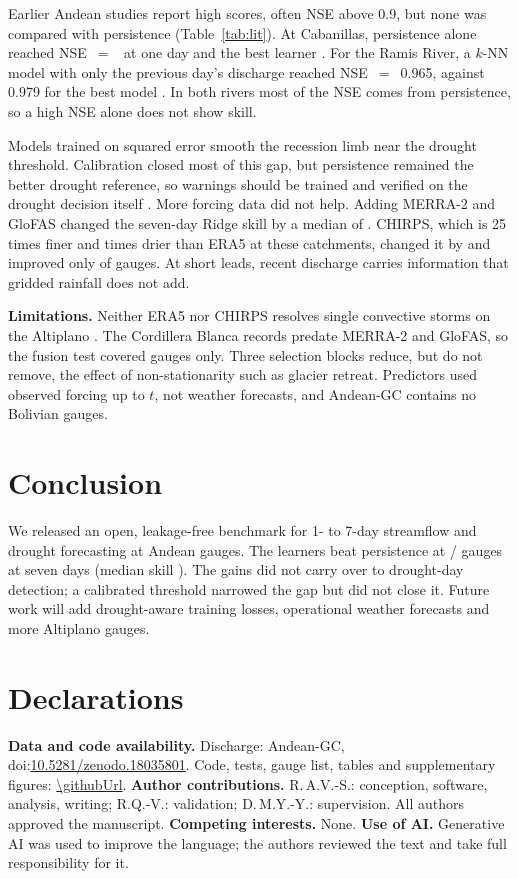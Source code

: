 \documentclass[graybox]{svmult}
\begin{document}
Earlier Andean studies report high scores, often NSE above 0.9, but none was compared with persistence (Table~\ref{tab:lit}). At Cabanillas, persistence alone reached NSE~$=$~\focusPersNseOne{} at one day and the best learner \focusBestNseOne{}. For the Ramis River, a $k$-NN model with only the previous day's discharge reached NSE~$=$~0.965, against 0.979 for the best model \cite{quispe2023ramis}. In both rivers most of the NSE comes from persistence, so a high NSE alone does not show skill.

Models trained on squared error smooth the recession limb near the drought threshold. Calibration closed most of this gap, but persistence remained the better drought reference, so warnings should be trained and verified on the drought decision itself \cite{sutanto2021definitions}. More forcing data did not help. Adding MERRA-2 and GloFAS changed the seven-day Ridge skill by a median of \fusionMedDeltaRidge{}. CHIRPS, which is 25 times finer and \eraChirpsRatio{} times drier than ERA5 at these catchments, changed it by \chirpsMedDeltaRidge{} and improved only \chirpsNPosRidge{} of \nChirps{} gauges. At short leads, recent discharge carries information that gridded rainfall does not add.

\textbf{Limitations.} Neither ERA5 nor CHIRPS resolves single convective storms on the Altiplano \cite{garreaud2003altiplano}. The Cordillera Blanca records predate MERRA-2 and GloFAS, so the fusion test covered \nFusion{} gauges only. Three selection blocks reduce, but do not remove, the effect of non-stationarity such as glacier retreat. Predictors used observed forcing up to $t$, not weather forecasts, and Andean-GC contains no Bolivian gauges.

\section{Conclusion}
\label{sec:conclusion}

We released an open, leakage-free benchmark for 1- to 7-day streamflow and drought forecasting at \nGauges{} Andean gauges. The learners beat persistence at \nPosSeven{}/\nGauges{} gauges at seven days (median skill \medSkillSeven{}). The gains did not carry over to drought-day detection; a calibrated threshold narrowed the gap but did not close it. Future work will add drought-aware training losses, operational weather forecasts and more Altiplano gauges.

\section*{Declarations}
\noindent\textbf{Data and code availability.} Discharge: Andean-GC, doi:\href{https://doi.org/10.5281/zenodo.18035801}{10.5281/zenodo.18035801}. Code, tests, gauge list, tables and supplementary figures: {\small\url{\githubUrl}}. \textbf{Author contributions.} R.\,A.V.-S.: conception, software, analysis, writing; R.Q.-V.: validation; D.\,M.Y.-Y.: supervision. All authors approved the manuscript. \textbf{Competing interests.} None. \textbf{Use of AI.} Generative AI was used to improve the language; the authors reviewed the text and take full responsibility for it.



\end{document}
